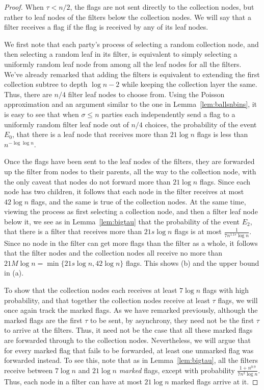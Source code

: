 \documentclass[11pt,letter]{article}
\theoremstyle{mytheoremstyle}
\begin{document}
\begin{proof}
	When $\tau < n/2$, the flags are not sent directly to the collection nodes, but rather to leaf nodes of the filters below the collection nodes.
	We will say that a filter receives a flag if the flag is received by any of its leaf nodes.
	
	We first note that each party's process of selecting a random collection node, and then selecting a random leaf in its filter, is equivalent to simply selecting a uniformly random leaf node from among all the leaf nodes for all the filters. We've already remarked that adding the filters is equivalent to extending the first collection subtree to depth $\log{n} -2$ while keeping the collection layer the same. Thus, there are $n/4$ filter leaf nodes to choose from. Using the Poisson approximation and an argument similar to the one in Lemma~\ref{lem:ballsnbins}, it is easy to see that when $\sigma \le n$ parties each independently send a flag to a uniformly random filter leaf node out of $n/4$ choices, the probability of the event $E_0$, that there is a leaf node that receives more than $21\log{n}$ flags is less than $n^{-\log\log{n}}$.
	
	Once the flags have been sent to the leaf nodes of the filters, they are forwarded up the filter from nodes to their parents, all the way to the collection node, with the only caveat that nodes do not forward more than $21\log{n}$ flags. Since each node has two children, it follows that each node in the filter receives at most $42\log{n}$ flags, and the same is true of the collection nodes. At the same time, viewing the process as first selecting a collection node, and then a filter leaf node below it, we see as in Lemma~\ref{lem:bigtau} that the probability of the event $E_2$, that there is a filter that receives more than $21s\log{n}$ flags is at most $\frac1{7n^{1.1s}\log{n}}$. Since no node in the filter can get more flags than the filter as a whole, it follows that the filter nodes and the collection nodes all receive no more than $21M\log{n} = \min\{21s\log{n}, 42\log{n}\}$ flags. This shows (b) and the upper bound in (a).
	
	To show that the collection nodes each receives at least $7\log{n}$ flags with high probability, and that together the collection nodes receive at least $\tau$ flags, we will once again track the marked flags. As we have remarked previously, although the marked flags are the first $\tau$ to be sent, by asynchrony, they need not be the first $\tau$ to arrive at the filters.
	Thus, it need not be the case that all these marked flags are forwarded through to the collection nodes. Nevertheless, we will argue that for every marked flag that fails to be forwarded, at least one unmarked flag was forwarded instead.
	To see this, note that as in Lemma~\ref{lem:bigtau}, all the filters receive between $7\log{n}$ and $21\log{n}$ \emph{marked} flags, except with probability $\frac{1+n^{0.9}}{7n^2\log{n}}$. Thus, each node in a filter can have at most $21\log{n}$ marked flags arrive at it.
	

\end{proof}
\end{document}

